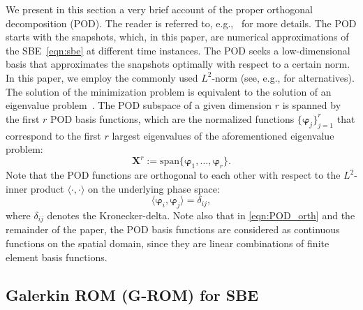\documentclass[11pt]{amsart}
\numberwithin{equation}{section}
\def\be{\begin{equation}}
\def\ee{\end{equation}}
\newcommand{\bX}{\boldsymbol{X}}
\newcommand{\bphi}{\boldsymbol{\varphi}}
\begin{document}
We present in this section a very brief account of the proper orthogonal decomposition (POD). The reader is referred to, e.g.,~\cite{HLB96,noack2011reduced,Sir87abc} for more details.
The POD starts with the snapshots, which, in this paper, are numerical approximations of the SBE~\eqref{eqn:sbe} at different time instances.  
The POD seeks a low-dimensional basis that approximates the snapshots optimally with respect to a certain norm. 
In this paper, we employ the commonly used $L^2$-norm (see, e.g., \cite{KV01} for alternatives). 
The solution of the minimization problem is equivalent to the solution of an eigenvalue problem~\cite{caiazzo2013numerical}.
The POD subspace of a given dimension $r$ is spanned by the first $r$ POD basis functions, which are the normalized functions $\{ \bphi_{j} \}_{j=1}^{r}$ that correspond to the first $r$ largest eigenvalues of the aforementioned eigenvalue problem: 
\be
\bX^r := \text{span} \{ \bphi_1, \ldots, \bphi_r \}.
\ee
Note that the POD functions are orthogonal to each other with respect to the $L^2$-inner product $\langle \cdot , \cdot \rangle$ on the underlying phase space:
\be \label{eqn:POD_orth}
\langle \bphi_i, \bphi_j \rangle = \delta_{ij},
\ee
where $\delta_{ij}$ denotes the Kronecker-delta. Note also that in \eqref{eqn:POD_orth} and the remainder of the paper,  the POD basis functions are considered as continuous functions on the spatial domain, since they are linear combinations of finite element basis functions. 



\subsection{Galerkin ROM (G-ROM) for SBE}
    \label{sec:g-rom}
\end{document}
